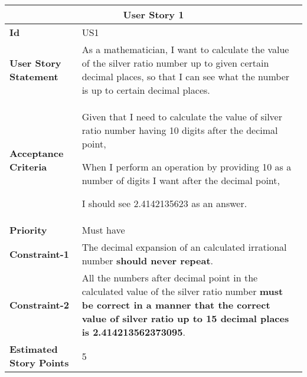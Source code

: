 \begin{center}
\begin{tabular}{ | m{2.3cm} | m{12cm} | } 

 \hline
 \multicolumn{2}{|c|}{\textbf{User Story 1}} \\

\hline
\textbf{Id} & US1 \\ 

\hline
\textbf{User Story Statement} & As a mathematician, I want to calculate the value of the silver ratio number up to given certain decimal places, so that I can see what the number is up to certain decimal places. \\ 

\hline
\textbf{Acceptance Criteria} & Given that I need to calculate the value of silver ratio number having 10 digits after the decimal point,

When I perform an operation by providing 10 as a number of digits I want after the decimal point,

I should see 2.4142135623 as an answer.\\ 

\hline
\textbf{Priority} & Must have \\ 

\hline
\textbf{Constraint-1} & The decimal expansion of an calculated irrational number \textbf{should never repeat}.\\ 

\hline
\textbf{Constraint-2} & All the numbers after decimal point in the calculated value of the silver ratio number \textbf{must be correct in a manner that the correct value of silver ratio up to 15 decimal places is 2.414213562373095}.\\ 

\hline
\textbf{Estimated Story Points} & 5 \\ 
\hline

\end{tabular}
\end{center}

